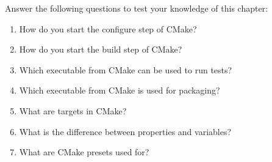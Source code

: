 
Answer the following questions to test your knowledge of this chapter:

\begin{enumerate}
\item 
How do you start the configure step of CMake?

\item 
How do you start the build step of CMake?

\item 
Which executable from CMake can be used to run tests?

\item 
Which executable from CMake is used for packaging?

\item 
What are targets in CMake?

\item 
What is the difference between properties and variables?

\item 
What are CMake presets used for?
\end{enumerate}
